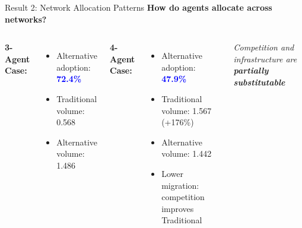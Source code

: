 \documentclass[aspectratio=169]{beamer}
\begin{document}
\begin{frame}{Result 2: Network Allocation Patterns}
    \textbf{How do agents allocate across networks?}
    
    \vspace{0.3cm}
    \begin{columns}
        \textbf{3-Agent Case:}
        \begin{itemize}
            \item Alternative adoption: \textcolor{blue}{\textbf{72.4\%}}
            \item Traditional volume: 0.568
            \item Alternative volume: 1.486
        \end{itemize}
        
        \vspace{0.3cm}
        \textbf{4-Agent Case:}
        \begin{itemize}
            \item Alternative adoption: \textcolor{blue}{\textbf{47.9\%}}
            \item Traditional volume: 1.567 (+176\%)
            \item Alternative volume: 1.442
            \item Lower migration: competition improves Traditional
        \end{itemize}
        
        \centering
        
        \vspace{0.3cm}
        \small{\textit{Competition and infrastructure are \textbf{partially substitutable}}}
    \end{columns}
\end{frame}
\end{document}
